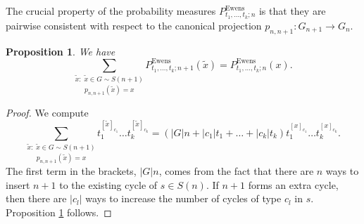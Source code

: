 \documentclass[12pt]{amsart}
\newtheorem{prop}[thm]{Proposition}
\theoremstyle{definition}
\numberwithin{equation}{section}
\DeclareMathOperator{\Ewens}{Ewens}
\begin{document}
The crucial property of the probability measures $P_{t_1,\ldots,t_k; n}^{\Ewens}$
is that they are pairwise consistent with respect to the canonical projection
$p_{n,n+1}: G_{n+1}\longrightarrow G_n$.
\begin{prop}\label{PropositionProjection}We have
\begin{equation}
\underset{p_{n,n+1}(\tilde{x})=x}{\sum\limits_{\tilde{x}:\; \tilde{x}\in G\sim S(n+1)}}P_{t_1,\ldots,t_k;n+1}^{\Ewens}(\tilde{x})
=P_{t_1,\ldots,t_k;n}^{\Ewens}(x).
\end{equation}
\end{prop}
\begin{proof} We compute
\begin{equation}
\underset{p_{n,n+1}(\tilde{x})=x}{\sum\limits_{\tilde{x}:\; \tilde{x}\in G\sim S(n+1)}}t_1^{[\tilde{x}]_{c_1}}
\ldots t_k^{[\tilde{x}]_{c_k}}
=\left(|G|n+|c_1|t_1+\ldots+|c_k|t_k\right)t_1^{[x]_{c_1}}\ldots t_k^{[x]_{c_k}}.
\end{equation}
The first term in the brackets, $|G|n$, comes from the fact that there are $n$ ways to insert $n+1$ to the existing cycle of $s\in S(n)$. If $n+1$ forms an extra cycle, then there are $|c_l|$ ways to increase the number of cycles of type $c_l$ in $s$. Proposition \ref{PropositionProjection} follows.
\end{proof}
\end{document}
